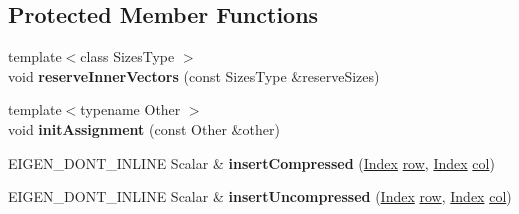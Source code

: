 \subsection*{Protected Member Functions}
\begin{DoxyCompactItemize}
\item 
\mbox{\label{class_eigen_1_1_sparse_matrix_ad17cf1b581f5ce7a32043fbc2a3716f6}} 
{\footnotesize template$<$class Sizes\+Type $>$ }\\void {\bfseries reserve\+Inner\+Vectors} (const Sizes\+Type \&reserve\+Sizes)
\item 
\mbox{\label{class_eigen_1_1_sparse_matrix_aefa867746934b4e933a3774a65574a74}} 
{\footnotesize template$<$typename Other $>$ }\\void {\bfseries init\+Assignment} (const Other \&other)
\item 
\mbox{\label{class_eigen_1_1_sparse_matrix_aa42b94d156a18cf4ec9b48e363f9d25a}} 
E\+I\+G\+E\+N\+\_\+\+D\+O\+N\+T\+\_\+\+I\+N\+L\+I\+NE Scalar \& {\bfseries insert\+Compressed} (\mbox{\hyperlink{struct_eigen_1_1_eigen_base_a554f30542cc2316add4b1ea0a492ff02}{Index}} \mbox{\hyperlink{class_eigen_1_1_sparse_matrix_base_ac0a5563ed3f243f013fb9d2c17e230d0}{row}}, \mbox{\hyperlink{struct_eigen_1_1_eigen_base_a554f30542cc2316add4b1ea0a492ff02}{Index}} \mbox{\hyperlink{class_eigen_1_1_sparse_matrix_base_a8f4eaa3c3921ef3823ffc69ebcc356af}{col}})
\item 
\mbox{\label{class_eigen_1_1_sparse_matrix_af7c472a42b3a7ca63ddcd8d23c06e10b}} 
E\+I\+G\+E\+N\+\_\+\+D\+O\+N\+T\+\_\+\+I\+N\+L\+I\+NE Scalar \& {\bfseries insert\+Uncompressed} (\mbox{\hyperlink{struct_eigen_1_1_eigen_base_a554f30542cc2316add4b1ea0a492ff02}{Index}} \mbox{\hyperlink{class_eigen_1_1_sparse_matrix_base_ac0a5563ed3f243f013fb9d2c17e230d0}{row}}, \mbox{\hyperlink{struct_eigen_1_1_eigen_base_a554f30542cc2316add4b1ea0a492ff02}{Index}} \mbox{\hyperlink{class_eigen_1_1_sparse_matrix_base_a8f4eaa3c3921ef3823ffc69ebcc356af}{col}})
\end{DoxyCompactItemize}
